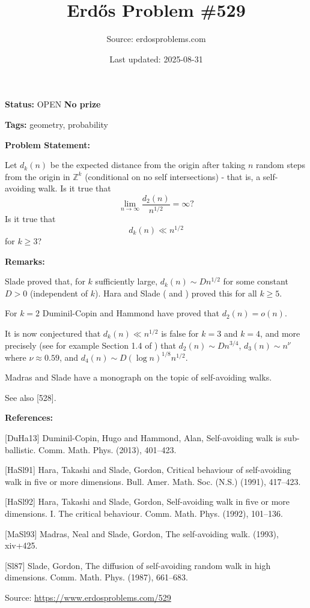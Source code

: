 \documentclass{article}
\title{Erd\H{o}s Problem \#529}
\date{Last updated: 2025-08-31}
\author{Source: erdosproblems.com}
\begin{document}
\maketitle

\noindent\textbf{Status:} OPEN \quad \textbf{No prize}

\noindent\textbf{Tags:} geometry, probability

\medskip
\noindent\textbf{Problem Statement:}

Let $d_k(n)$ be the expected distance from the origin after taking $n$ random steps from the origin in $\mathbb{Z}^k$ (conditional on no self intersections) - that is, a self-avoiding walk. Is it true that\[\lim_{n\to \infty}\frac{d_2(n)}{n^{1/2}}= \infty?\]Is it true that\[d_k(n)\ll n^{1/2}\]for $k\geq 3$?

\bigskip
\noindent\textbf{Remarks:}

Slade \cite{Sl87} proved that, for $k$ sufficiently large, $d_k(n)\sim Dn^{1/2}$ for some constant $D>0$ (independent of $k$). Hara and Slade (\cite{HaSl91} and \cite{HaSl92}) proved this for all $k\geq 5$.

For $k=2$ Duminil-Copin and Hammond \cite{DuHa13} have proved that $d_2(n)=o(n)$.

It is now conjectured that $d_k(n)\ll n^{1/2}$ is false for $k=3$ and $k=4$, and more precisely (see for example Section 1.4 of \cite{MaSl93}) that $d_2(n)\sim Dn^{3/4}$, $d_3(n)\sim n^{\nu}$ where $\nu\approx 0.59$, and $d_4(n)\sim D(\log n)^{1/8}n^{1/2}$.

Madras and Slade \cite{MaSl93} have a monograph on the topic of self-avoiding walks.

See also [528].

\bigskip
\noindent\textbf{References:}

[DuHa13] Duminil-Copin, Hugo and Hammond, Alan, Self-avoiding walk is sub-ballistic. Comm. Math. Phys. (2013), 401--423.
 
 [HaSl91] Hara, Takashi and Slade, Gordon, Critical behaviour of self-avoiding walk in five or more
dimensions. Bull. Amer. Math. Soc. (N.S.) (1991), 417--423.
 
 [HaSl92] Hara, Takashi and Slade, Gordon, Self-avoiding walk in five or more dimensions. I. The
critical behaviour. Comm. Math. Phys. (1992), 101--136.
 
 [MaSl93] Madras, Neal and Slade, Gordon, The self-avoiding walk. (1993), xiv+425.
 
 [Sl87] Slade, Gordon, The diffusion of self-avoiding random walk in high dimensions. Comm. Math. Phys. (1987), 661--683.

\bigskip
\noindent\small{Source: \url{https://www.erdosproblems.com/529}}
\end{document}
